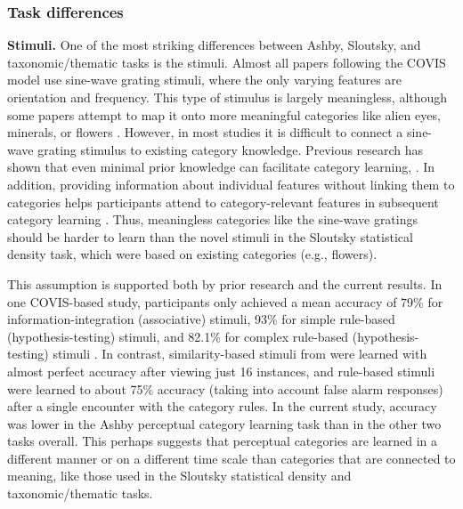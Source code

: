 \documentclass[../dissertation.tex]{subfiles}
\begin{document}
\subsubsection{Task differences}

\textbf{Stimuli.} One of the most striking differences between Ashby, Sloutsky, and taxonomic/thematic tasks is the stimuli. Almost all papers following the COVIS model use sine-wave grating stimuli, where the only varying features are orientation and frequency. This type of stimulus is largely meaningless, although some papers attempt to map it onto more meaningful categories like alien eyes, minerals, or flowers \citep{Tolins2015, Perry2015}. However, in most studies it is difficult to connect a sine-wave grating stimulus to existing category knowledge. Previous research has shown that even minimal prior knowledge can facilitate category learning, \citep{Kaplan2000}. In addition, providing information about individual features without linking them to categories helps participants attend to category-relevant features in subsequent category learning \citep{Kim2011}. Thus, meaningless categories like the sine-wave gratings should be harder to learn than the novel stimuli in the Sloutsky statistical density task, which were based on existing categories (e.g., flowers). \par
	This assumption is supported both by prior research and the current results. In one COVIS-based study, participants only achieved a mean accuracy of 79\% for information-integration (associative) stimuli, 93\% for simple rule-based (hypothesis-testing) stimuli, and 82.1\% for complex rule-based (hypothesis-testing) stimuli \citep{Helie2010}. In contrast, similarity-based stimuli from \citet{Kloos2008} were learned with almost perfect accuracy after viewing just 16 instances, and rule-based stimuli were learned to about 75\% accuracy (taking into account false alarm responses) after a single encounter with the category rules. In the current study, accuracy was lower in the Ashby perceptual category learning task than in the other two tasks overall. This perhaps suggests that perceptual categories are learned in a different manner or on a different time scale than categories that are connected to meaning, like those used in the Sloutsky statistical density and taxonomic/thematic tasks. \par
\end{document}
